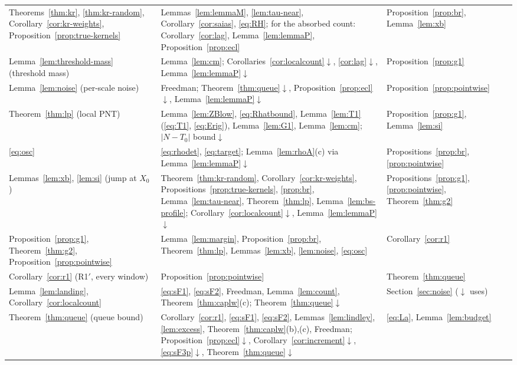 \begin{center}
\begin{tabular}{@{}p{4.4cm}p{6.6cm}p{3.5cm}@{}}
Theorems~\ref{thm:kr}, \ref{thm:kr-random}, Corollary~\ref{cor:kr-weights}, Proposition~\ref{prop:true-kernels} & Lemmas~\ref{lem:lemmaM}, \ref{lem:tau-near}, Corollary~\ref{cor:saias}, \eqref{eq:RH}; for the absorbed count: Corollary~\ref{cor:lag}, Lemma~\ref{lem:lemmaP}, Proposition~\ref{prop:ecl} & Proposition~\ref{prop:br}, Lemma~\ref{lem:xb} \\
Lemma~\ref{lem:threshold-mass} (threshold mass) & Lemma~\ref{lem:cm}; Corollaries~\ref{cor:localcount}$\downarrow$, \ref{cor:lag}$\downarrow$, Lemma~\ref{lem:lemmaP}$\downarrow$ & Proposition~\ref{prop:g1} \\
Lemma~\ref{lem:noise} (per-scale noise) & Freedman; Theorem~\ref{thm:queue}$\downarrow$, Proposition~\ref{prop:ecl}$\downarrow$, Lemma~\ref{lem:lemmaP}$\downarrow$ & Proposition~\ref{prop:pointwise} \\
Theorem~\ref{thm:lp} (local PNT) & Lemma~\ref{lem:ZBlow}, \eqref{eq:Rhatbound}, Lemma~\ref{lem:T1} (\eqref{eq:T1}, \eqref{eq:Erig}), Lemma~\ref{lem:G1}, Lemma~\ref{lem:cm}; $|N-T_0|$ bound$\downarrow$ & Proposition~\ref{prop:g1}, Lemma~\ref{lem:si} \\
\eqref{eq:osc} & \eqref{eq:rhodet}, \eqref{eq:target}; Lemma~\ref{lem:rhoA}(c) via Lemma~\ref{lem:lemmaP}$\downarrow$ & Propositions~\ref{prop:br}, \ref{prop:pointwise} \\
Lemmas~\ref{lem:xb}, \ref{lem:si} (jump at $X_0$) & Theorem~\ref{thm:kr-random}, Corollary~\ref{cor:kr-weights}, Propositions~\ref{prop:true-kernels}, \ref{prop:br}, Lemma~\ref{lem:tau-near}, Theorem~\ref{thm:lp}, Lemma~\ref{lem:bs-profile}; Corollary~\ref{cor:localcount}$\downarrow$, Lemma~\ref{lem:lemmaP}$\downarrow$ & Propositions~\ref{prop:g1}, \ref{prop:pointwise}, Theorem~\ref{thm:g2} \\
Proposition~\ref{prop:g1}, Theorem~\ref{thm:g2}, Proposition~\ref{prop:pointwise} & Lemma~\ref{lem:margin}, Proposition~\ref{prop:br}, Theorem~\ref{thm:lp}, Lemmas~\ref{lem:xb}, \ref{lem:noise}, \eqref{eq:osc} & Corollary~\ref{cor:r1} \\
Corollary~\ref{cor:r1} (R1$'$, every window) & Proposition~\ref{prop:pointwise} & Theorem~\ref{thm:queue} \\
Lemma~\ref{lem:landing}, Corollary~\ref{cor:localcount} & \ref{eq:sF1}, \ref{eq:sF2}, Freedman, Lemma~\ref{lem:count}, Theorem~\ref{thm:caplw}(c); Theorem~\ref{thm:queue}$\downarrow$ & Section~\ref{sec:noise} ($\downarrow$ uses) \\
Theorem~\ref{thm:queue} (queue bound) & Corollary~\ref{cor:r1}, \ref{eq:sF1}, \ref{eq:sF2}, Lemmas~\ref{lem:lindley}, \ref{lem:excess}, Theorem~\ref{thm:caplw}(b),(c), Freedman; Proposition~\ref{prop:ecl}$\downarrow$, Corollary~\ref{cor:increment}$\downarrow$, \ref{eq:sF3p}$\downarrow$, Theorem~\ref{thm:queue}$\downarrow$ & \eqref{eq:La}, Lemma~\ref{lem:budget} \\

\end{tabular}
\end{center}
